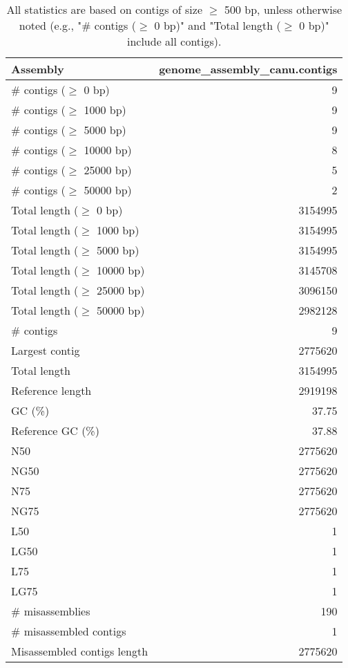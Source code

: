 \documentclass[12pt,a4paper]{article}
\begin{document}
\begin{table}[ht]
\begin{center}
\caption{All statistics are based on contigs of size $\geq$ 500 bp, unless otherwise noted (e.g., "\# contigs ($\geq$ 0 bp)" and "Total length ($\geq$ 0 bp)" include all contigs).}
\begin{tabular}{|l*{1}{|r}|}
\hline
Assembly & genome\_assembly\_canu.contigs \\ \hline
\# contigs ($\geq$ 0 bp) & 9 \\ \hline
\# contigs ($\geq$ 1000 bp) & 9 \\ \hline
\# contigs ($\geq$ 5000 bp) & 9 \\ \hline
\# contigs ($\geq$ 10000 bp) & 8 \\ \hline
\# contigs ($\geq$ 25000 bp) & 5 \\ \hline
\# contigs ($\geq$ 50000 bp) & 2 \\ \hline
Total length ($\geq$ 0 bp) & 3154995 \\ \hline
Total length ($\geq$ 1000 bp) & 3154995 \\ \hline
Total length ($\geq$ 5000 bp) & 3154995 \\ \hline
Total length ($\geq$ 10000 bp) & 3145708 \\ \hline
Total length ($\geq$ 25000 bp) & 3096150 \\ \hline
Total length ($\geq$ 50000 bp) & 2982128 \\ \hline
\# contigs & 9 \\ \hline
Largest contig & 2775620 \\ \hline
Total length & 3154995 \\ \hline
Reference length & 2919198 \\ \hline
GC (\%) & 37.75 \\ \hline
Reference GC (\%) & 37.88 \\ \hline
N50 & 2775620 \\ \hline
NG50 & 2775620 \\ \hline
N75 & 2775620 \\ \hline
NG75 & 2775620 \\ \hline
L50 & 1 \\ \hline
LG50 & 1 \\ \hline
L75 & 1 \\ \hline
LG75 & 1 \\ \hline
\# misassemblies & 190 \\ \hline
\# misassembled contigs & 1 \\ \hline
Misassembled contigs length & 2775620 \\ \hline

\end{tabular}
\end{center}
\end{table}
\end{document}
